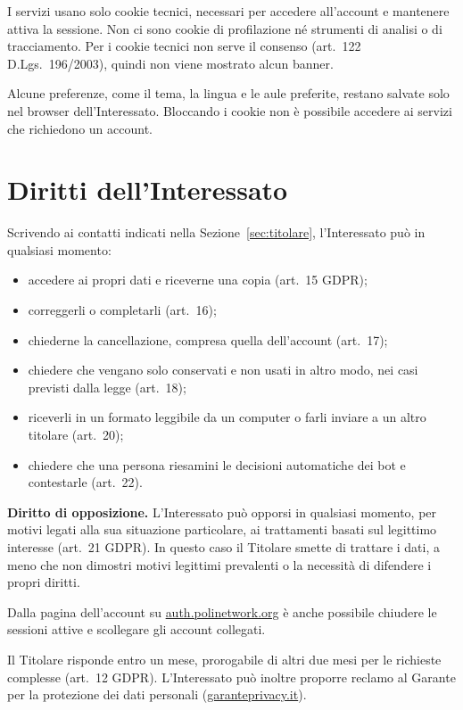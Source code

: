 \documentclass[legal]{polinetwork}
\begin{document}
I servizi usano solo cookie tecnici, necessari per accedere all'account e mantenere attiva la sessione. Non ci sono cookie di profilazione né strumenti di analisi o di tracciamento. Per i cookie tecnici non serve il consenso (art.~122 D.Lgs.~196/2003), quindi non viene mostrato alcun banner.

Alcune preferenze, come il tema, la lingua e le aule preferite, restano salvate solo nel browser dell'Interessato. Bloccando i cookie non è possibile accedere ai servizi che richiedono un account.

\section{Diritti dell'Interessato}
\label{sec:diritti}

Scrivendo ai contatti indicati nella Sezione~\ref{sec:titolare}, l'Interessato può in qualsiasi momento:
\begin{itemize}
    \item accedere ai propri dati e riceverne una copia (art.~15 GDPR);
    \item correggerli o completarli (art.~16);
    \item chiederne la cancellazione, compresa quella dell'account (art.~17);
    \item chiedere che vengano solo conservati e non usati in altro modo, nei casi previsti dalla legge (art.~18);
    \item riceverli in un formato leggibile da un computer o farli inviare a un altro titolare (art.~20);
    \item chiedere che una persona riesamini le decisioni automatiche dei bot e contestarle (art.~22).
\end{itemize}

\textbf{Diritto di opposizione.} L'Interessato può opporsi in qualsiasi momento, per motivi legati alla sua situazione particolare, ai trattamenti basati sul legittimo interesse (art.~21 GDPR). In questo caso il Titolare smette di trattare i dati, a meno che non dimostri motivi legittimi prevalenti o la necessità di difendere i propri diritti.

Dalla pagina dell'account su \href{https://auth.polinetwork.org}{auth.polinetwork.org} è anche possibile chiudere le sessioni attive e scollegare gli account collegati.

Il Titolare risponde entro un mese, prorogabile di altri due mesi per le richieste complesse (art.~12 GDPR). L'Interessato può inoltre proporre reclamo al Garante per la protezione dei dati personali (\href{https://www.garanteprivacy.it}{garanteprivacy.it}).
\end{document}
